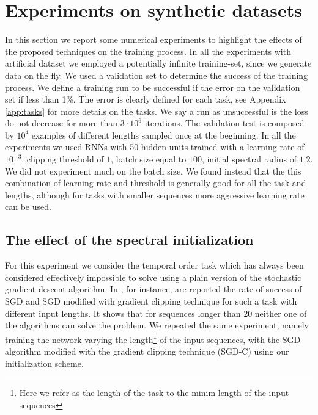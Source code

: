 \section{Experiments on synthetic datasets}
In this section we report some numerical experiments to highlight the effects of the proposed techniques on the training process. In all the experiments with artificial dataset we employed a potentially infinite training-set, since we generate data on the fly. We used a validation set to determine the success of the training process. We define a training run to be successful if the error on the validation set if less than 1\%. The error is clearly defined for each task, see Appendix \ref{app:tasks} for more details on the tasks. We say a run as unsuccessful is the loss do not decrease for more than $3\cdot 10^6$ iterations. The validation test is composed by $10^4$ examples of different lengths sampled once at the beginning. In all the experiments we used RNNs with 50 hidden units trained with a learning rate of $10^{-3}$, clipping threshold of $1$, batch size equal to $100$, initial spectral radius of $1.2$. We did not experiment much on the batch size. We found instead that the this combination of learning rate and threshold is generally good for all the task and lengths, although for tasks with smaller sequences more aggressive learning rate can be used.

\subsection{The effect of the spectral initialization}

For this experiment we consider the temporal order task which has always been considered effectively impossible to solve using a plain version of the stochastic  gradient descent algorithm.
In \cite{advancesInOptimizingRnns}, for instance, are reported the rate of success of SGD and SGD modified with gradient clipping technique for such a task with different input lengths. It shows that for sequences longer than 20 neither one of the algorithms can solve the problem. We repeated the same experiment, namely training the network varying the length\footnote{Here we refer as the length of the task to the minim length of the input sequences} of the input sequences, with the SGD algorithm modified with the gradient clipping technique (SGD-C) using our initialization scheme. 

